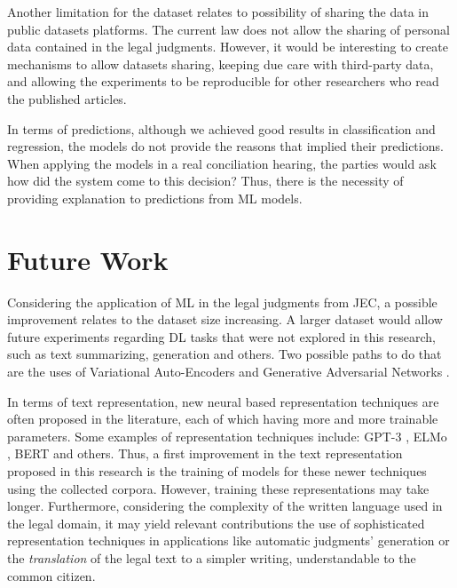 Another limitation for the dataset relates to possibility of sharing the data in public datasets platforms. The current law does not allow the sharing of personal data contained in the legal judgments. However, it would be interesting to create mechanisms to allow datasets sharing, keeping due care with third-party data, and allowing the experiments to be reproducible for other researchers who read the published articles.  

In terms of predictions, although we achieved good results in classification and regression, the models do not provide the reasons that implied their predictions. When applying the models in a real conciliation hearing, the parties would ask how did the system come to this decision?  Thus, there is the necessity of providing explanation to predictions from ML models.



\section{Future Work}


Considering the application of ML in the legal judgments from \gls{JEC}, a possible improvement relates to the dataset size increasing. A larger dataset would allow future experiments regarding \gls{DL} tasks that were not explored in this research, such as text summarizing, generation and others.  Two possible paths to do that are the uses of Variational Auto-Encoders  and Generative Adversarial Networks  \cite{Kingma2019, Iqbal2020}.

In terms of text representation, new neural based representation techniques are often proposed in the literature, each of which having more and more trainable parameters. Some examples of representation techniques include: \gls{GPT-3} \cite{Brown2020}, \gls{ELMo} \cite{Peters2018}, \gls{BERT} \cite{Devlin2018} and others.
Thus, a first improvement in the text representation proposed in this research is the training of models for these newer techniques using the collected corpora. However, training these representations may take longer.
Furthermore, considering the complexity of the written language used in the legal domain, it may yield relevant contributions the use of sophisticated  representation techniques in applications like automatic judgments' generation or the \textit{translation} of the legal text to a simpler writing, understandable to the common citizen.

